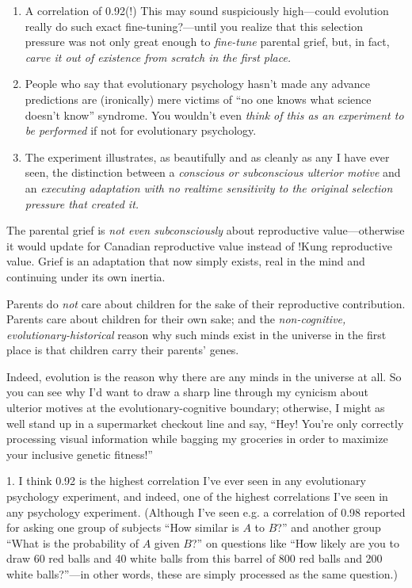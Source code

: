 \begin{enumerate}
\item {
 A correlation of 0.92(!) This may sound suspiciously high---could
evolution really do such exact fine-tuning?---until you realize that
this selection pressure was not only great enough to \textit{fine-tune}
parental grief, but, in fact, \textit{carve it out of existence from
scratch in the first place.}}

\item {
 People who say that evolutionary psychology hasn't
made any advance predictions are (ironically) mere victims of
``no one knows what science doesn't
know'' syndrome. You wouldn't even
\textit{think of this as an experiment to be performed} if not for
evolutionary psychology.}

\item {
 The experiment illustrates, as beautifully and as cleanly as any I
have ever seen, the distinction between a \textit{conscious or
subconscious ulterior motive} and an \textit{executing adaptation with
no realtime sensitivity to the original selection pressure that created
it.}}

\end{enumerate}

{
 The parental grief is \textit{not even subconsciously} about
reproductive value---otherwise it would update for Canadian
reproductive value instead of !Kung reproductive value. Grief is an
adaptation that now simply exists, real in the mind and continuing
under its own inertia.}

{
 Parents do \textit{not} care about children for the sake of their
reproductive contribution. Parents care about children for their own
sake; and the \textit{non-cognitive, evolutionary-historical} reason
why such minds exist in the universe in the first place is that
children carry their parents' genes.}

{
 Indeed, evolution is the reason why there are any minds in the
universe at all. So you can see why I'd want to draw a
sharp line through my cynicism about ulterior motives at the
evolutionary-cognitive boundary; otherwise, I might as well stand up in
a supermarket checkout line and say, ``Hey!
You're only correctly processing visual information
while bagging my groceries in order to maximize your inclusive genetic
fitness!''}

{
 1. I think 0.92 is the highest correlation I've
ever seen in any evolutionary psychology experiment, and indeed, one of
the highest correlations I've seen in any psychology
experiment. (Although I've seen e.g. a correlation of
0.98 reported for asking one group of subjects ``How
similar is $A$ to $B$?'' and another group
``What is the probability of $A$ given
$B$?'' on questions like ``How likely
are you to draw 60 red balls and 40 white balls from this barrel of 800
red balls and 200 white balls?''---in other words,
these are simply processed as the same question.)}

